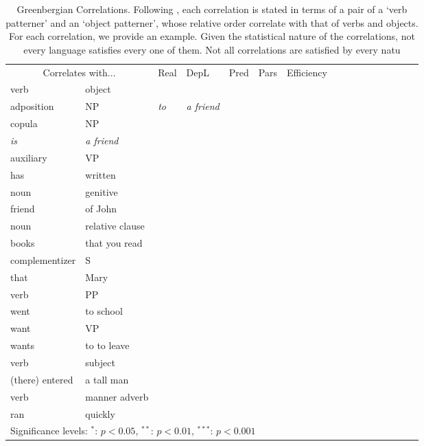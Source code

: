 \documentclass[9pt,twocolumn,twoside,lineno]{pnas-new}
\begin{document}
\begin{table}
	\begin{center}
\begin{tabular}{|ll|l|l|l|ll|l|llllllll}
	\hline
	\multicolumn{2}{|c|}{Correlates with...}   &         \multirow{2}{*}{Real}   & \multirow{2}{*}{DepL}  & \multirow{2}{*}{Pred}   &  \multirow{2}{*}{Pars} &  \multirow{2}{*}{Efficiency}  \\ 
	verb & object     & & & &  & \\ \hline \hline %
	adposition    &    NP       & 	\emph{to}            & \emph{a friend} \\

copula    &    NP        &     \\
	\emph{	is}        & \emph{a friend} \\
auxiliary    &    VP       &   \\
	has          & written \\
noun    &    genitive      &  \\
friend &  of John \\
noun    &    relative clause       &  \\
	books & that you read \\
complementizer    &    S        & \\
	that & Mary \\
verb    &    PP     &    \\
	went & to school \\
want    &    VP      &    \\
	wants   & to to leave \\
verb    &    subject    &  \\
	(there) entered & a tall man \\
verb    &    manner adverb     & \\
	ran & quickly\\
 \hline
    \multicolumn{6}{l}{\footnotesize{Significance levels: $^*$: $p < 0.05$, $^{**}$: $p < 0.01$, $^{***}$: $p < 0.001$}}
\end{tabular}
	\end{center}
	\caption{Greenbergian Correlations. Following \cite{dryer1992greenbergian}, each correlation is stated in terms of a pair of a `verb patterner' and an `object patterner', whose relative order correlate with that of verbs and objects.
For each correlation, we provide an example.
Given the statistical nature of the correlations, not every language satisfies every one of them.
Not all correlations are satisfied by every natu
}\label{table:corr-dryer}
\end{table}
\end{document}
